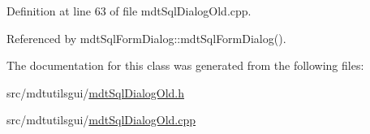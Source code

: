 Definition at line 63 of file mdt\-Sql\-Dialog\-Old.\-cpp.



Referenced by mdt\-Sql\-Form\-Dialog\-::mdt\-Sql\-Form\-Dialog().



The documentation for this class was generated from the following files\-:\begin{DoxyCompactItemize}
\item 
src/mdtutilsgui/\hyperlink{mdt_sql_dialog_old_8h}{mdt\-Sql\-Dialog\-Old.\-h}\item 
src/mdtutilsgui/\hyperlink{mdt_sql_dialog_old_8cpp}{mdt\-Sql\-Dialog\-Old.\-cpp}\end{DoxyCompactItemize}
